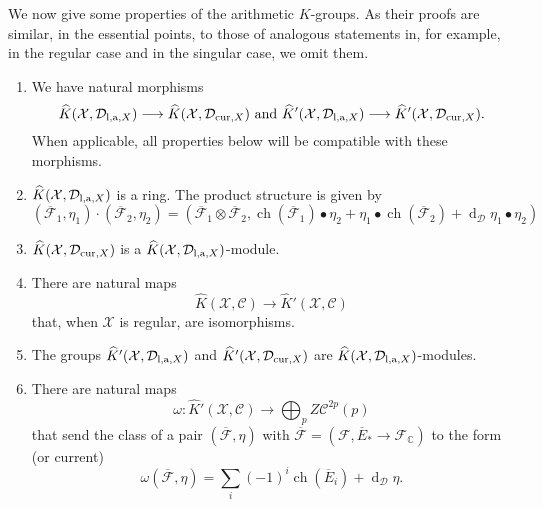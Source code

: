 \documentclass[10pt,twoside]{article}
\numberwithin{equation}{section}
\theoremstyle{plain}
\theoremstyle{definition}
\DeclareMathOperator{\dd}{d}
\DeclareMathOperator{\ch}{ch}
\renewcommand\labelenumi{(\roman{enumi})}
\newcommand{\CC}{{\mathbb C}}
\newcommand{\las}{{\text{\rm l,a}}}
\newcommand{\D}{\text{{\rm cur}}}
\begin{document}
We now give some properties of the arithmetic $K$-groups. As their
proofs are similar, in the essential
points, to those of analogous statements in, for example,
\cite{GilletSoule:ait} in the regular case and
\cite{GilletSoule:aRRt} in the singular case,
we omit them.
\begin{enumerate}
\item We have natural morphisms
$$\widehat{K}(\mathcal{X},\mathcal{D}_{\las,X}) \longrightarrow
\widehat{K}(\mathcal{X},\mathcal{D}_{\D,X})\text{ and }
\widehat{K}'(\mathcal{X},\mathcal{D}_{\las,X}) \longrightarrow
\widehat{K}'(\mathcal{X},\mathcal{D}_{\D,X}).
$$
  When applicable, all properties below will be compatible with these
  morphisms.  
\item $\widehat{K}(\mathcal{X},\mathcal{D}_{\las,X})$ is a ring. The
  product structure is given by
  \begin{equation}\label{eq:78}
    (\overline{\mathcal{F}}_{1},\eta_{1})\cdot
    (\overline{\mathcal{F}}_{2},\eta_{2})=
    (\overline{\mathcal{F}}_{1}\otimes
    \overline{\mathcal{F}}_{2},\ch(\overline{\mathcal{F}}_{1})\bullet
    \eta_{2}+\eta_{1}\bullet\ch(\overline{\mathcal{F}}_{2})+
 \dd_{\mathcal{D}}\eta_{1}\bullet \eta_{2})
  \end{equation}

\item $\widehat{K}(\mathcal{X},\mathcal{D}_{\D,X})$ is a 
$\widehat{K}(\mathcal{X},\mathcal{D}_{\las,X})$-module.

\item There are natural maps 
$$
\widehat{K}(\mathcal{X},\mathcal{C}) \longrightarrow 
\widehat{K}'(\mathcal{X},\mathcal{C}) 
$$
that, when $\mathcal{X}$ is regular, are isomorphisms.

\item The groups $\widehat{K}'(\mathcal{X},\mathcal{D}_{\las,X})$ and $
\widehat{K}'(\mathcal{X},\mathcal{D}_{\D,X})$ are  
$\widehat{K}(\mathcal{X},\mathcal{D}_{\las,X})$-modules.

\item There are natural maps 
$$
\omega \colon \widehat K'(\mathcal{X},\mathcal{C})
\longrightarrow \bigoplus _{p}Z\mathcal{C}^{2p}(p)
$$
that send the class of a pair $(\overline {\mathcal{F}},\eta)$ with  
$\overline {\mathcal{F}}=(\mathcal{F},\overline
E_{\ast}\to\mathcal{F}_{\CC})$ to the form (or current)
\begin{displaymath}
  \omega (\overline {\mathcal{F}},\eta)=\sum_{i}(-1)^{i}\ch(\overline
  E_{i}) +\dd_{\mathcal{D}}\eta.
\end{displaymath}



\end{enumerate}
\end{document}
